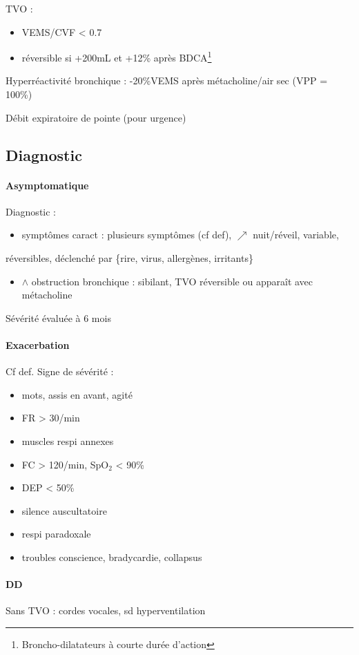 \documentclass{article}
\begin{document}
TVO : 
\begin{itemize}
\item VEMS/CVF < 0.7
\item réversible si +200mL et +12\% après BDCA\footnote{Broncho-dilatateurs à courte durée
d'action}
\end{itemize}

Hyperréactivité bronchique : -20\%VEMS après métacholine/air sec (VPP = 100\%)

Débit expiratoire de pointe (pour urgence)

\subsection{Diagnostic}
\paragraph{Asymptomatique}
Diagnostic :
\begin{itemize}
\item symptômes caract : plusieurs symptômes (cf def), $\nearrow$ nuit/réveil, variable,
\end{itemize}
réversibles, déclenché par \{rire, virus, allergènes, irritants\}
\begin{itemize}
\item \(\wedge\) obstruction bronchique : sibilant, TVO réversible ou apparaît avec métacholine
\end{itemize}
Sévérité évaluée à 6 mois
\paragraph{Exacerbation}
Cf def. Signe de sévérité :
\begin{itemize}
\item mots, assis en avant, agité
\item FR > 30/min
\item muscles respi annexes
\item FC > 120/min, SpO\(_{\text{2}}\) < 90\%
\item DEP < 50\%
\item silence auscultatoire \skull
\item respi paradoxale \skull
\item troubles conscience, bradycardie, collapsus \skull
\end{itemize}
\paragraph{DD}
Sans TVO : cordes vocales, sd hyperventilation
\end{document}
